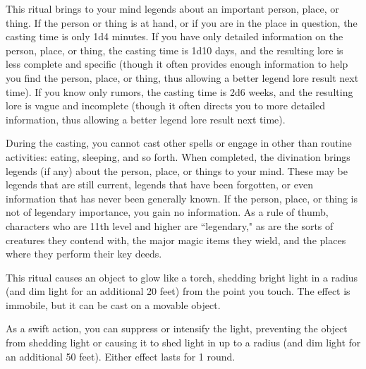 \spelleffect This ritual brings to your mind legends about an important person, place, or thing. If the person or thing is at hand, or if you are in the place in question, the casting time is only 1d4 minutes. If you have only detailed information on the person, place, or thing, the casting time is 1d10 days, and the resulting lore is less complete and specific (though it often provides enough information to help you find the person, place, or thing, thus allowing a better legend lore result next time). If you know only rumors, the casting time is 2d6 weeks, and the resulting lore is vague and incomplete (though it often directs you to more detailed information, thus allowing a better legend lore result next time).
\par During the casting, you cannot cast other spells or engage in other than routine activities: eating, sleeping, and so forth. When completed, the divination brings legends (if any) about the person, place, or things to your mind. These may be legends that are still current, legends that have been forgotten, or even information that has never been generally known. If the person, place, or thing is not of legendary importance, you gain no information. As a rule of thumb, characters who are 11th level and higher are ``legendary," as are the sorts of creatures they contend with, the major magic items they wield, and the places where they perform their key deeds.

\spelldur{\durlong \dismissable}
\spelleffect This ritual causes an object to glow like a torch, shedding bright light in a \areamed radius (and dim light for an additional 20 feet) from the point you touch. The effect is immobile, but it can be cast on a movable object.

As a swift action, you can suppress or intensify the light, preventing the object from shedding light or causing it to shed light in up to a \arealarge radius (and dim light for an additional 50 feet). Either effect lasts for 1 round.

